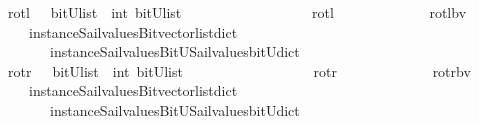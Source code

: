 \begin{isabellebody}
\isanewline
{}\isamarkupfalse%
\ rotl\ \ {\isacharcolon}{\isacharcolon}\ {\isachardoublequoteopen}{\isacharparenleft}bitU{\isacharparenright}list\ {\isasymRightarrow}\ int\ {\isasymRightarrow}{\isacharparenleft}bitU{\isacharparenright}list\ {\isachardoublequoteclose}\ \ \ \ \ \ \ \ \ \ \ \isanewline
\ \ \ \ \ {\isachardoublequoteopen}\ rotl\ \ \ \ \ \ \ \ \ {\isacharequal}\ {\isacharparenleft}\ \isanewline
\ \ rotl{\isacharunderscore}bv\isanewline
\ \ \ \ {\isacharparenleft}instance{\isacharunderscore}Sail{}{\isacharunderscore}values{\isacharunderscore}Bitvector{\isacharunderscore}list{\isacharunderscore}dict\isanewline
\ \ \ \ \ \ \ instance{\isacharunderscore}Sail{}{\isacharunderscore}values{\isacharunderscore}BitU{\isacharunderscore}Sail{}{\isacharunderscore}values{\isacharunderscore}bitU{\isacharunderscore}dict{\isacharparenright}\ {\isacharparenright}{\isachardoublequoteclose}\isanewline
\isanewline
{}\isamarkupfalse%
\ rotr\ \ {\isacharcolon}{\isacharcolon}\ {\isachardoublequoteopen}{\isacharparenleft}bitU{\isacharparenright}list\ {\isasymRightarrow}\ int\ {\isasymRightarrow}{\isacharparenleft}bitU{\isacharparenright}list\ {\isachardoublequoteclose}\ \ \ \ \ \ \ \ \ \ \ \isanewline
\ \ \ \ \ {\isachardoublequoteopen}\ rotr\ \ \ \ \ \ \ \ \ {\isacharequal}\ {\isacharparenleft}\ \isanewline
\ \ rotr{\isacharunderscore}bv\isanewline
\ \ \ \ {\isacharparenleft}instance{\isacharunderscore}Sail{}{\isacharunderscore}values{\isacharunderscore}Bitvector{\isacharunderscore}list{\isacharunderscore}dict\isanewline
\ \ \ \ \ \ \ instance{\isacharunderscore}Sail{}{\isacharunderscore}values{\isacharunderscore}BitU{\isacharunderscore}Sail{}{\isacharunderscore}values{\isacharunderscore}bitU{\isacharunderscore}dict{\isacharparenright}\ {\isacharparenright}{\isachardoublequoteclose}\isanewline
\isanewline
\isanewline
%
\isanewline
%
\isanewline
%
\end{isabellebody}
